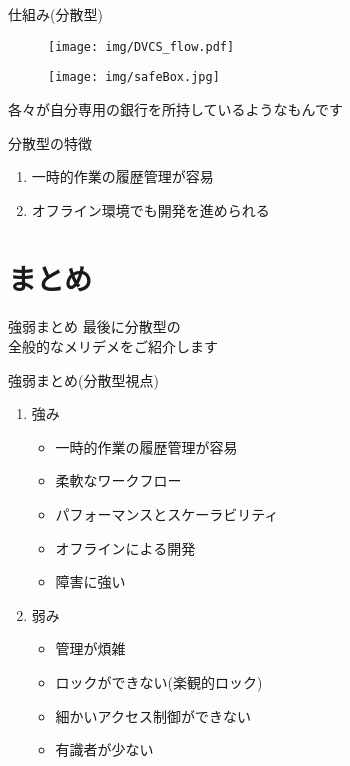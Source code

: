 \documentclass[dvipdfmx]{beamer}
\begin{document}
\begin{frame}{仕組み(分散型)}
\begin{center}
\begin{figure}
\texttt{[image: img/DVCS\_flow.pdf]}
\end{figure}
\end{center}
\end{frame}

\begin{frame}{}
\begin{center}
\begin{figure}
\texttt{[image: img/safeBox.jpg]}
\end{figure}
\end{center}
\vspace{6cm}
\color{blue}\huge{各々が自分専用の銀行を所持しているようなもんです}
\end{frame}

\begin{frame}{分散型の特徴}
\begin{enumerate}
\item 一時的作業の履歴管理が容易
\pause
\vspace{1.5cm}
\item オフライン環境でも開発を進められる
\end{enumerate}
\end{frame}

\section{まとめ}
\begin{frame}{強弱まとめ} \huge{最後に分散型の\\
全般的なメリデメをご紹介します}
\end{frame}

\begin{frame}{強弱まとめ(分散型視点)}
\begin{enumerate}
\item 強み
\begin{itemize}
\item<2-> 一時的作業の履歴管理が容易
\item<2-> 柔軟なワークフロー
\item<2-> パフォーマンスとスケーラビリティ
\item<2-> オフラインによる開発
\item<2-> 障害に強い
\end{itemize}
\vspace{0.5cm}
\item 弱み
\begin{itemize}
\item<3-> 管理が煩雑
\item<3-> ロックができない(楽観的ロック)
\item<3-> 細かいアクセス制御ができない
\item<3-> 有識者が少ない
\end{itemize}
\end{enumerate}
\end{frame}
\end{document}
